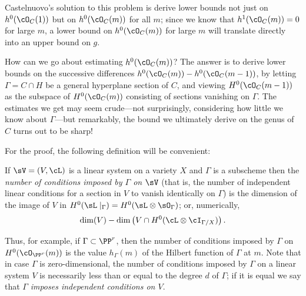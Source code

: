 Castelnuovo's solution to this problem is derive lower bounds not just on $h^0(\cO_C(1))$ but on $h^0(\cO_C(m))$ for all $m$; since we know that $h^1(\cO_C(m)) = 0$ for large $m$, a lower bound on $h^0(\cO_C(m))$ for large $m$ will translate directly into an upper bound on $g$.

How can we go about estimating $h^0(\cO_C(m))$? The answer is to derive lower bounds on the successive differences $h^0(\cO_C(m)) - h^0(\cO_C(m-1))$, by letting $\Gamma = C \cap H$ be a general hyperplane section of $C$, and viewing $H^0(\cO_C(m-1))$ as the subspace of $H^0(\cO_C(m))$ consisting of sections vanishing on $\Gamma$. The estimates we get may seem crude---not surprisingly, considering how little we know about $\Gamma$---but remarkably, the bound we ultimately derive on the genus of $C$ turns out to be sharp!

For the proof, the following definition will be convenient:

\begin{definition}
If $\sV = (V,\cL)$ is a linear system on a variety $X$ and $\Gamma$ is a subscheme then the \emph{number of conditions imposed by $\Gamma$ on $\sV$} (that is, the number of independent linear conditions for a section in $V$ to vanish
identically on $\Gamma$) is the dimension of the image of $V$ in $H^0(\sL\mid_\Gamma) = H^0(\sL \otimes \sO_\Gamma)$; or, numerically,
$$
\dim(V) - \dim \left(V \cap H^0(\cL\otimes \cI_{\Gamma/X}) \right).
$$
\end{definition}

Thus, for example, if $\Gamma \subset \PP^r$, then the number of conditions imposed by $\Gamma$ on $H^0(\cO_{\PP^r}(m))$ is the value $h_\Gamma(m)$ of the Hilbert function of $\Gamma$ at $m$.
Note that in case $\Gamma$ is zero-dimensional, the number of conditions imposed by $\Gamma$ on a linear system $V$ is necessarily less than or equal to the degree $d$ of $\Gamma$; if it is equal we say that $\Gamma$ \emph{imposes independent conditions on $V$}.

